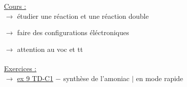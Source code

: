 \documentclass{book}
\begin{document}
\underline{\Large{Cours :}} \\

$\rightarrow$ étudier une réaction et une réaction double

$\rightarrow$ faire des configurations éléctroniques

$\rightarrow$ attention au voc et tt \\
\\
\underline{\Large{Exercices :}} \\

$\rightarrow$ \underline{ex 9 TD-C1} $-$ synthèse de l'amoniac $|$ en mode rapide \\
\end{document}
